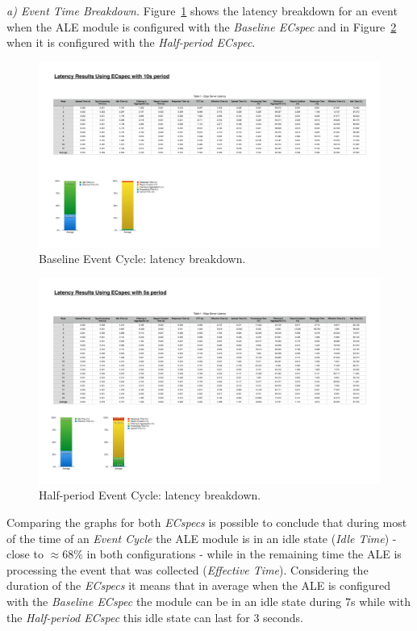 \textit{a) Event Time Breakdown.}
Figure~\ref{fig:ecspec_base} shows the latency breakdown for an event when the \gls{ALE} module is
configured with the \textit{Baseline ECspec} and in Figure~\ref{fig:ecspec_half} when it is configured
with the \textit{Half-period ECspec}.

\begin{figure}[ht!]
 \centering
 \includegraphics[width=.55\linewidth]{./figures/edge_ecspec_breakdown}
 \caption{Baseline Event Cycle: latency breakdown.}
 \label{fig:ecspec_base}
\end{figure}

\begin{figure}[ht!]
 \centering
 \includegraphics[width=.55\linewidth]{./figures/edge_ecspecf_breakdown}
 \caption{Half-period Event Cycle: latency breakdown.}
 \label{fig:ecspec_half}
\end{figure}

Comparing the graphs for both \textit{ECspecs} is possible to conclude that during most of the time of
an \textit{Event Cycle} the \gls{ALE} module is in an idle state (\textit{Idle Time}) - close to $\approx68\%$
in both configurations - while in the remaining time the \gls{ALE} is processing the event that was
collected (\textit{Effective Time}). Considering the duration of the \textit{ECspecs} it means that in
average when the \gls{ALE} is configured with the \textit{Baseline ECspec} the module can be in an idle
state during 7s while with the \textit{Half-period ECspec} this idle state can last for 3 seconds.\\

